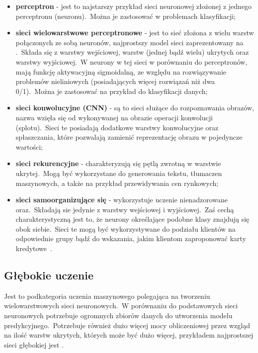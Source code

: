 \begin{itemize}
    \item \textbf{perceptron} - jest to najstarszy przykład sieci neuronowej złożonej z jednego perceptronu (neuronu).\ Można je zastosować w problemach klasyfikacji;
    \item \textbf{sieci wielowarstwowe perceptronowe} - jest to sieć złożona z wielu warstw połączonych ze sobą neuronów, najprostszy model sieci zaprezentowany na .\ Składa się z warstwy wejściowej, warstw (jednej bądź wielu) ukrytych oraz warstwy wyjściowej.\ W neurony w tej sieci w porównaniu do perceptronów, mają funkcję aktywacyjną sigmoidalną, ze względu na rozwiązywanie problemów nieliniowych (posiadających więcej rozwiązań niż dwa 0/1).\ Można je zastosować na przykład do klasyfikacji danych;
    \item \textbf{sieci konwolucyjne (CNN)} - są to sieci służące do rozpoznawania obrazów, nazwa wzięła się od wykonywanej na obrazie operacji konwolucji (splotu).\ Sieci te posiadają dodatkowe warstwy konwolucyjne oraz spłaszczania, które pozwalają zamienić reprezentację obrazu w pojedyncze wartości;
    \item \textbf{sieci rekurencyjne} - charakteryzują się pętlą zwrotną w warstwie ukrytej.\ Mogą być wykorzystane do generowania tekstu, tłumaczen maszynowych, a także na przykład przewidywania cen rynkowych;
    \item \textbf{sieci samoorganizujące się} - wykorzystuje uczenie nienadzorowane oraz.\ Składają sie jedynie z warstwy wejściowej i wyjściowej.\ Zaś cechą charakterystyczną jest to, że neurony określające podobne klasy znajdują się obok siebie.\ Sieci te mogą być wykorzystywane do podziału klientów na odpowiednie grupy bądź do wskazania, jakim klientom zaproponować karty kredytowe~\cite{IBMNetwork, BartosSOM}.
\end{itemize}
\vfill
\pagebreak

\subsection{Głębokie uczenie}
Jest to podkategoria uczenia maszynowego polegająca na tworzeniu wielowarstwowych sieci neuronowych.\ W porównaniu do podstawowych sieci neuronowych potrzebuje ogromnych zbiorów danych do utworzenia modelu predykcyjnego.\ Potrzebuje również dużo więcej mocy obliczeniowej przez wzgląd na ilość warstw ukrytych, których może być dużo więcej, przykładem najprostszej sieci głębokiej jest .

